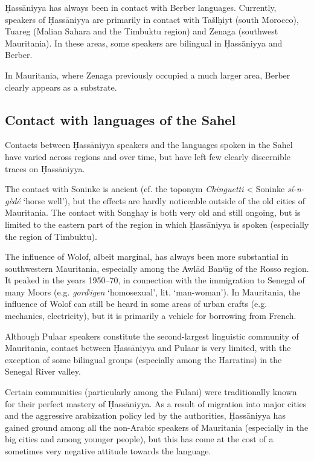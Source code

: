 \documentclass[output=paper]{langsci/langscibook}
\begin{document}
Ḥassāniyya has always been in contact with Berber languages. Currently, speakers of Ḥassāniyya are primarily in contact with Tašlḥiyt (south Morocco), Tuareg (Malian Sahara and the Timbuktu region) and Zenaga (southwest Mauritania). In these areas, some speakers are bilingual in Ḥassāniyya and Berber. 

In Mauritania, where Zenaga previously occupied a much larger area, Berber clearly appears as a substrate.

\subsection{ Contact with languages of the Sahel} %

Contacts between Ḥassāniyya speakers and the languages spoken in the Sahel have varied across regions and over time, but have left few clearly discernible traces on Ḥassāniyya.

The contact with Soninke is ancient (cf. the toponym \textit{Chinguetti} < Soninke \textit{sí-n-gèdé} ‘horse well’), but the effects are hardly noticeable outside of the old cities of Mauritania. The contact with Songhay is both very old and still ongoing, but is limited to the eastern part of the region in which Ḥassāniyya is spoken (especially the region of Timbuktu).

The influence of Wolof, albeit marginal, has always been more substantial in southwestern Mauritania, especially among the Awlād Banʲūg of the Rosso region. It peaked in the years 1950–70, in connection with the immigration to Senegal of many Moors (e.g. \textit{gordʲigen} ‘homosexual’, lit. ‘man-woman’). In Mauritania, the influence of Wolof can still be heard in some areas of urban crafts (e.g. mechanics, electricity), but it is primarily a vehicle for borrowing from French.

Although Pulaar speakers constitute the second-largest linguistic community of Mauritania, contact between Ḥassāniyya and Pulaar is very limited, with the exception of some bilingual groups (especially among the Harratins) in the Senegal River valley.

Certain communities (particularly among the Fulani) were traditionally known for their perfect mastery of Ḥassāniyya. As a result of migration into major cities and the aggressive arabization policy led by the authorities, Ḥassāniyya has gained ground among all the non-Arabic speakers of Mauritania (especially in the big cities and among younger people), but this has come at the cost of a sometimes very negative attitude towards the language. 
\end{document}
